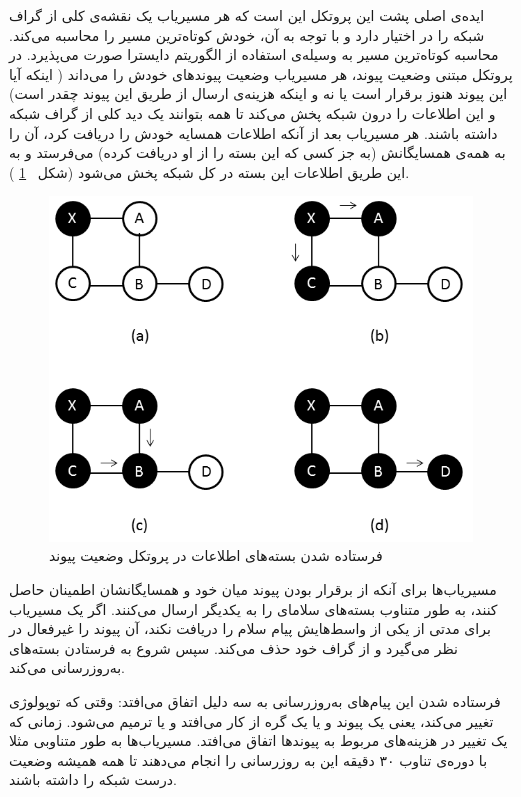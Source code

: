  ایده‌ی اصلی پشت این پروتکل این است که هر مسیریاب یک نقشه‌ی کلی از گراف شبکه را در اختیار دارد و با توجه به آن، خودش کوتاه‌ترین مسیر را محاسبه ‌می‌کند. محاسبه کوتاه‌ترین مسیر به وسیله‌ی استفاده از الگوریتم دایسترا صورت می‌پذیرد. در پروتکل مبتنی وضعیت پیوند، هر مسیریاب وضعیت پیوند‌های خودش را می‌داند (‌ اینکه آیا این پیوند هنوز برقرار است یا نه و اینکه هزینه‌ی ارسال از طریق این پیوند چقدر است) و این اطلاعات را درون شبکه پخش می‌کند تا همه بتوانند یک دید کلی از گراف شبکه داشته باشند. هر مسیریاب بعد از آنکه اطلاعات همسایه خودش را دریافت کرد، آن را به همه‌ی همسایگانش (‌به جز کسی که این بسته را از او دریافت کرده)‌ می‌فرستد و به این طریق اطلاعات این بسته در کل شبکه پخش می‌شود (شکل 
~\ref{fig:linkstate}
 ).
 \begin{figure}[H]
\centering
\includegraphics[scale=0.6]{./resources/figures/linkstate.png}
\caption{فرستاده شدن بسته‌‌های اطلاعات در پروتکل وضعیت پیوند}
\label{fig:linkstate}
\end{figure}
 
 مسیریاب‌ها برای آنکه از برقرار بودن پیوند میان خود و همسایگانشان اطمینان حاصل کنند، به طور متناوب بسته‌های سلامای را به یکدیگر ارسال می‌کنند. اگر یک مسیریاب برای مدتی از یکی از واسط‌هایش پیام سلام را دریافت نکند، آن پیوند را غیرفعال در نظر می‌گیرد و از گراف خود حذف می‌کند. سپس شروع به فرستادن بسته‌های به‌روزرسانی می‌کند. 
 
فرستاده شدن این پیام‌های به‌روزرسانی به سه دلیل اتفاق می‌افتد:
 وقتی که توپولوژی تغییر می‌کند، یعنی یک پیوند و یا یک گره از کار می‌افتد و یا ترمیم می‌شود. 
 زمانی که یک تغییر در هزینه‌های مربوط به پیوند‌ها اتفاق می‌افتد. 
  مسیریاب‌ها به طور متناوبی مثلا با دوره‌ی تناوب ۳۰ دقیقه این به روزرسانی را انجام می‌دهند تا همه همیشه وضعیت درست شبکه را داشته باشند.

